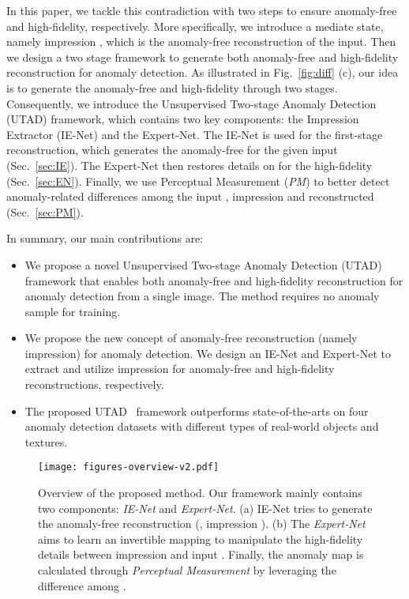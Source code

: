 \documentclass[final]{cvpr}
\newcommand{\proposed}{UTAD}
\begin{document}
In this paper, we tackle this contradiction with two steps to ensure anomaly-free and high-fidelity, respectively.
More specifically, we introduce a mediate state, namely impression , which is the anomaly-free reconstruction of the input. 
Then we design a two stage framework to generate both anomaly-free and high-fidelity reconstruction for anomaly detection.
As illustrated in Fig.~\ref{fig:diff} (c), our idea is to generate the anomaly-free and high-fidelity  through two stages.
Consequently, we introduce the Unsupervised Two-stage Anomaly Detection (\proposed) framework, which contains two key components: the Impression Extractor (IE-Net) and the Expert-Net. The IE-Net is used for the first-stage reconstruction, which generates the anomaly-free  for the given input  (Sec.~\ref{sec:IE}). The Expert-Net then restores details on  for the high-fidelity  (Sec.~\ref{sec:EN}). Finally, we use Perceptual Measurement (\textit{PM}) to better detect anomaly-related differences among the input , impression  and reconstructed  (Sec.~\ref{sec:PM}).

In summary, our main contributions are:
\begin{itemize}
    \item We propose a novel Unsupervised Two-stage Anomaly Detection (\proposed) framework that enables both anomaly-free and high-fidelity reconstruction for anomaly detection from a single image. The method requires no anomaly sample for training. 
    \item We propose the new concept of anomaly-free reconstruction (namely impression) for anomaly detection. We design an IE-Net and Expert-Net to extract and utilize impression for anomaly-free and high-fidelity reconstructions, respectively. 
    \item The proposed \proposed~ framework outperforms state-of-the-arts on four anomaly detection datasets with different types of real-world objects and textures. 
\end{itemize}


\begin{figure*}
	\begin{center}
		\texttt{[image: figures-overview-v2.pdf]} 
	\end{center}
	\vspace{-0.2cm}
	\caption{Overview of the proposed method. Our framework mainly contains two components: \textit{IE-Net} and \textit{Expert-Net}. 
	(a) IE-Net tries to generate the anomaly-free reconstruction (\ie, impression ).
	(b) The \textit{Expert-Net} aims to learn an invertible mapping to manipulate the high-fidelity details between impression  and input .
	Finally, the anomaly map  is calculated through \textit{Perceptual Measurement}  by leveraging the difference among .
	}
	\label{fig:overview}
	\vspace{-0.3cm}
\end{figure*}
\end{document}
